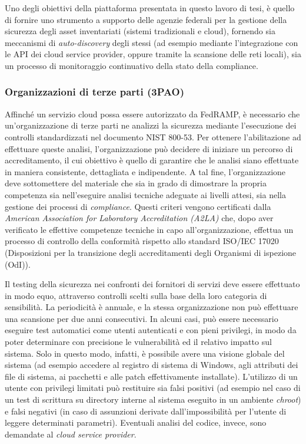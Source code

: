 \documentclass[../main.tex]{subfiles}
\begin{document}
Uno degli obiettivi della piattaforma presentata in questo lavoro di tesi, è quello di fornire uno strumento a supporto delle agenzie federali per la gestione della sicurezza degli asset inventariati (sistemi tradizionali e cloud), fornendo sia meccanismi di \textit{auto-discovery} degli stessi (ad esempio mediante l'integrazione con le API dei cloud service provider, oppure tramite la scansione delle reti locali), sia un processo di monitoraggio continuativo della stato della compliance.

\subsubsection{Organizzazioni di terze parti (3PAO)}
Affinché un servizio cloud possa essere autorizzato da FedRAMP, è necessario che un'organizzazione di terze parti ne analizzi la sicurezza mediante l'esecuzione dei controlli standardizzati nel documento NIST 800-53.
Per ottenere l'abilitazione ad effettuare queste analisi, l'organizzazione può decidere di iniziare un percorso di accreditamento, il cui obiettivo è quello di garantire che le analisi siano effettuate in maniera consistente, dettagliata e indipendente.
A tal fine, l'organizzazione deve sottomettere del materiale che sia in grado di dimostrare la propria competenza sia nell'eseguire analisi tecniche adeguate ai livelli attesi, sia nella gestione dei processi di \textit{compliance}.
Questi criteri vengono certificati dalla \textit{American Association for Laboratory Accreditation (A2LA)} che, dopo aver verificato le effettive competenze tecniche in capo all'organizzazione, effettua un processo di controllo della conformità rispetto allo standard ISO/IEC 17020 (Disposizioni per la transizione degli accreditamenti degli Organismi di ispezione (OdI)).


Il testing della sicurezza nei confronti dei fornitori di servizi deve essere effettuato in modo equo, attraverso controlli scelti sulla base della loro categoria di sensibilità. La periodicità è annuale, e la stessa organizzazione non può effettuare una scansione per due anni consecutivi.
In alcuni casi, può essere necessario eseguire test automatici come utenti autenticati e con pieni privilegi, in modo da poter determinare con precisione le vulnerabilità ed il relativo impatto sul sistema. Solo in questo modo, infatti, è possibile avere una visione globale del sistema (ad esempio accedere al registro di sistema di Windows, agli attributi dei file di sistema, ai pacchetti e alle patch effettivamente installate). L'utilizzo di un utente con privilegi limitati può restituire sia falsi positivi (ad esempio nel caso di un test di scrittura su directory interne al sistema eseguito in un ambiente \textit{chroot}) e falsi negativi (in caso di assunzioni derivate dall'impossibilità per l'utente di leggere determinati parametri).
Eventuali analisi del codice, invece, sono demandate al \textit{cloud service provider}.
\end{document}
